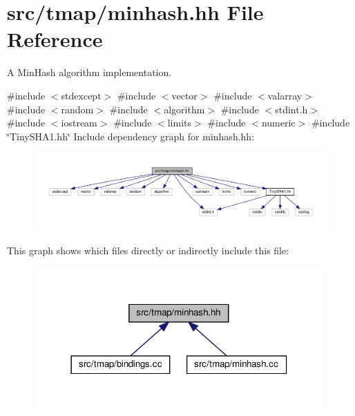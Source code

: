 \hypertarget{minhash_8hh}{}\section{src/tmap/minhash.hh File Reference}
\label{minhash_8hh}


A Min\+Hash algorithm implementation.  


{\ttfamily \#include $<$stdexcept$>$}\newline
{\ttfamily \#include $<$vector$>$}\newline
{\ttfamily \#include $<$valarray$>$}\newline
{\ttfamily \#include $<$random$>$}\newline
{\ttfamily \#include $<$algorithm$>$}\newline
{\ttfamily \#include $<$stdint.\+h$>$}\newline
{\ttfamily \#include $<$iostream$>$}\newline
{\ttfamily \#include $<$limits$>$}\newline
{\ttfamily \#include $<$numeric$>$}\newline
{\ttfamily \#include \char`\"{}Tiny\+S\+H\+A1.\+hh\char`\"{}}\newline
Include dependency graph for minhash.\+hh\+:\nopagebreak
\begin{figure}[H]
\begin{center}
\leavevmode
\includegraphics[width=350pt]{minhash_8hh__incl}
\end{center}
\end{figure}
This graph shows which files directly or indirectly include this file\+:\nopagebreak
\begin{figure}[H]
\begin{center}
\leavevmode
\includegraphics[width=314pt]{minhash_8hh__dep__incl}
\end{center}
\end{figure}
